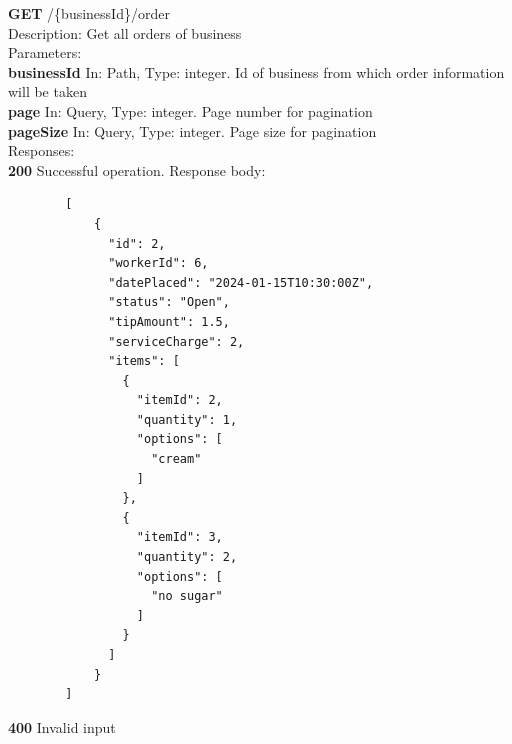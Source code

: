 \documentclass[11pt,a4paper,pdftex]{article}
\begin{document}
\hspace*{1em}\textbf{GET} /\{businessId\}/order\\
\hspace*{2em}Description: Get all orders of business\\
\hspace*{2em}Parameters:\\
\hspace*{3em}\textbf{businessId} In: Path, Type: integer. Id of business from which order information will be taken\\
\hspace*{3em}\textbf{page} In: Query, Type: integer. Page number for pagination\\
\hspace*{3em}\textbf{pageSize} In: Query, Type: integer. Page size for pagination\\
\hspace*{2em}Responses:\\
\hspace*{3em}\textbf{200} Successful operation. Response body:
\begin{verbatim}
        [
            {
              "id": 2,
              "workerId": 6,
              "datePlaced": "2024-01-15T10:30:00Z",
              "status": "Open",
              "tipAmount": 1.5,
              "serviceCharge": 2,
              "items": [
                {
                  "itemId": 2,
                  "quantity": 1,
                  "options": [
                    "cream"
                  ]
                },
                {
                  "itemId": 3,
                  "quantity": 2,
                  "options": [
                    "no sugar"
                  ]
                }
              ]
            }
        ]
\end{verbatim}
\hspace*{3em}\textbf{400} Invalid input
\end{document}

